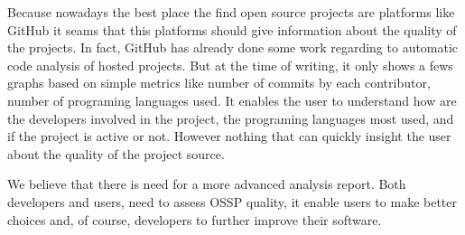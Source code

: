 Because nowadays the best place the find open source projects are platforms like GitHub 
it seams that this platforms should give information about the quality of the projects. 
In fact, GitHub has already done some work regarding to automatic code analysis of hosted projects.
But at the time of writing, it only shows a fews graphs based on simple metrics 
like number of commits by each contributor, number of programing languages used.
It enables the user to understand how are the developers involved in the project,
the programing languages most used, and if the project is active or not.
However nothing that can quickly insight the user about the quality of the project source.

We believe that there is need for a more advanced analysis report.
Both developers and users, need to assess OSSP quality, it enable users to make better choices and, of course, developers to further improve their software.
 
